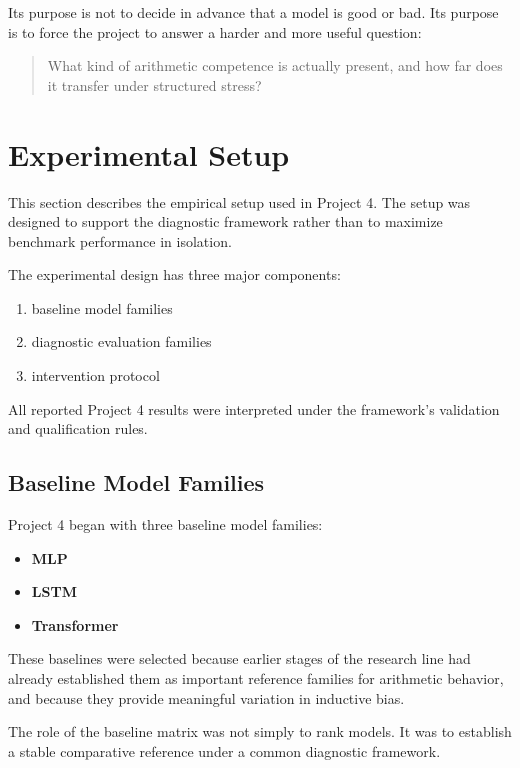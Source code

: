 \documentclass[11pt]{article}
\begin{document}
Its purpose is not to decide in advance that a model is good or bad. Its purpose is to force the project to answer a harder and more useful question:

\begin{quote}
What kind of arithmetic competence is actually present, and how far does it transfer under structured stress?
\end{quote}

\section{Experimental Setup}

This section describes the empirical setup used in Project 4. The setup was designed to support the diagnostic framework rather than to maximize benchmark performance in isolation.

The experimental design has three major components:
\begin{enumerate}[leftmargin=1.5em]
    \item baseline model families
    \item diagnostic evaluation families
    \item intervention protocol
\end{enumerate}

All reported Project 4 results were interpreted under the framework's validation and qualification rules.

\subsection{Baseline Model Families}

Project 4 began with three baseline model families:
\begin{itemize}[leftmargin=1.5em]
    \item \textbf{MLP}
    \item \textbf{LSTM}
    \item \textbf{Transformer}
\end{itemize}

These baselines were selected because earlier stages of the research line had already established them as important reference families for arithmetic behavior, and because they provide meaningful variation in inductive bias.

The role of the baseline matrix was not simply to rank models. It was to establish a stable comparative reference under a common diagnostic framework.
\end{document}
